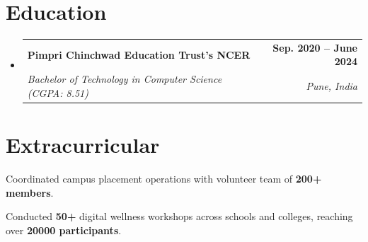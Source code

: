 \documentclass[letterpaper,10pt]{article}
\makeatletter
\newcommand{\resumeSubheading}[4]{
  \vspace{-1pt}\item
    \begin{tabular*}{1.0\textwidth}[t]{l@{\extracolsep{\fill}}r}
      \textbf{#1} & \textbf{\small #2} \\
      \textit{\small#3} & \textit{\small #4} \\
    \end{tabular*}\vspace{-5pt}
}
\newcommand{\resumeSubHeadingListStart}{\begin{itemize}[leftmargin=0.0in, label={}]}
\newcommand{\resumeSubHeadingListEnd}{\end{itemize}}
\makeatother
\begin{document}
\section{Education}
\resumeSubHeadingListStart
  \resumeSubheading
    {Pimpri Chinchwad Education Trust's NCER}{Sep. 2020 -- June 2024}
    {Bachelor of Technology in Computer Science (CGPA: 8.51)}{Pune, India}
\resumeSubHeadingListEnd
\vspace{-8pt}

\section{Extracurricular}
\begin{itemize}[leftmargin=0.15in, label={\tiny$\bullet$}]
  \setlength{\itemsep}{-2pt}
  \small{
    \item Coordinated campus placement operations with volunteer team of \textbf{200+ members}.
    \item Conducted \textbf{50+} digital wellness workshops across schools and colleges, reaching over \textbf{20000 participants}.
  }
\end{itemize}
\end{document}
